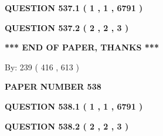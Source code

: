 \documentclass[12pt]{article}
\begin{document}
   
   
   
 \vspace{0.2in}
 
 
 
 
   
   
  
\vspace{0.2in}
  
{\textbf{\Large{QUESTION
537.1 
 ( 1 , 1 , 6791 )
}}}
  
  
  
\vspace{0.2in}
  
{\textbf{\Large{QUESTION
537.2 
 ( 2 , 2 , 3 )
}}}
  
  
   
   
 \vspace{0.2in}
 
   
   
   
   
\vspace{1.0in} 
{\textbf{\large{ *** END OF PAPER, THANKS *** }}} 
   
   
\hspace{1.0in} By: 
 239 ( 416 ,  613 )
   
   
   
   
\newpage 
\setcounter{page}{ 
   538001 } 
   
   
   
   
 {\textbf{ \Large{ PAPER NUMBER  538  }}}
   
   
\vspace{0.2in}
   
   
   
   
   
   
 \vspace{0.2in}
 
 
 
 
   
   
  
\vspace{0.2in}
  
{\textbf{\Large{QUESTION
538.1 
 ( 1 , 1 , 6791 )
}}}
  
  
  
\vspace{0.2in}
  
{\textbf{\Large{QUESTION
538.2 
 ( 2 , 2 , 3 )
}}}
  
  
   
   
 \vspace{0.2in}
 
\end{document}
